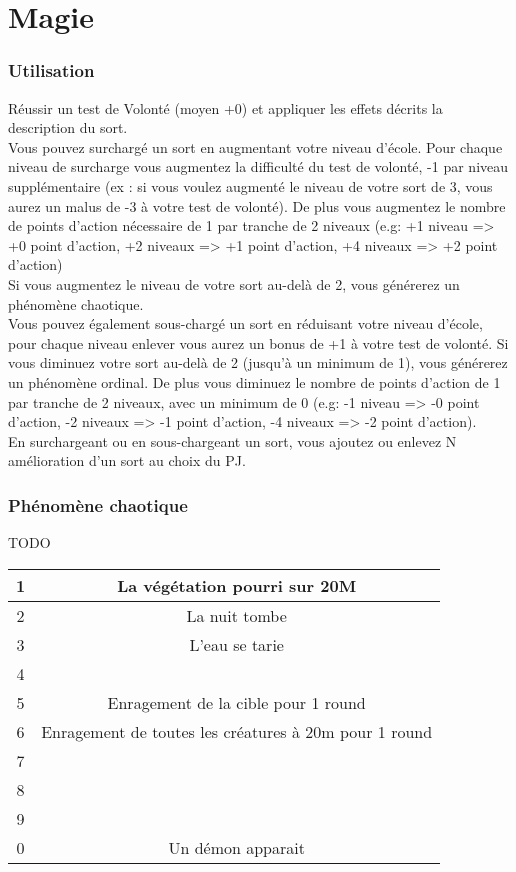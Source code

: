 \part{Magie}

\section{Utilisation}
Réussir un test de Volonté (moyen +0) et appliquer les effets décrits la description du sort. \\

	Vous pouvez surchargé un sort en augmentant votre niveau d'école. Pour chaque niveau de surcharge vous augmentez la difficulté du test de volonté, -1 par niveau supplémentaire (ex : si vous voulez augmenté le niveau de votre sort de 3, vous aurez un malus de -3 à votre test de volonté). De plus vous augmentez le nombre de points d'action nécessaire de 1 par tranche de 2 niveaux (e.g: +1 niveau  => +0 point d'action, +2 niveaux => +1 point d'action, +4 niveaux => +2 point d'action) \\
	Si vous augmentez le niveau de votre sort au-delà de 2, vous générerez un phénomène chaotique. \\
	Vous pouvez également sous-chargé un sort en réduisant votre niveau d'école, pour chaque niveau enlever vous aurez un bonus de +1 à votre test de volonté. Si vous diminuez votre sort au-delà de 2 (jusqu'à un minimum de 1), vous générerez un phénomène ordinal. De plus vous diminuez le nombre de points d'action de 1 par tranche de 2 niveaux, avec un minimum de 0 (e.g: -1 niveau => -0 point d'action, -2 niveaux => -1 point d'action, -4 niveaux => -2 point d'action). \\
	En surchargeant ou en sous-chargeant un sort, vous ajoutez ou enlevez N amélioration d'un sort au choix du PJ. \\
	
\section{Phénomène chaotique}
TODO
\begin{tabular}{|c|c|}
\hline
1 &  La végétation pourri sur 20M\\
\hline
2 &  La nuit tombe\\
\hline
3 &  L'eau se tarie\\
\hline
4 &  \\
\hline
5 &  Enragement de la cible pour 1 round\\
\hline
6 &  Enragement de toutes les créatures à 20m pour 1 round\\
\hline
7 &  \\
\hline
8 &  \\
\hline
9 &  \\
\hline
0 &  Un démon apparait\\
\hline
\end{tabular}

